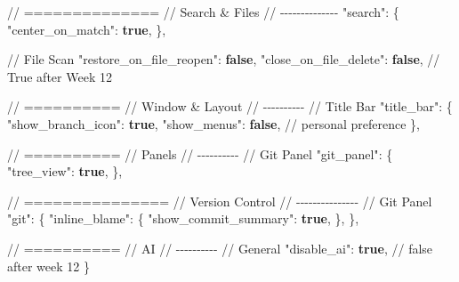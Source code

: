 \documentclass[
  letterpaper,
  DIV=11,
  numbers=noendperiod]{scrreprt}
\newenvironment{Shaded}{\begin{snugshade}}{\end{snugshade}}
\newcommand{\DataTypeTok}[1]{\textcolor[rgb]{0.68,0.00,0.00}{#1}}
\newcommand{\ErrorTok}[1]{\textcolor[rgb]{0.68,0.00,0.00}{#1}}
\newcommand{\FunctionTok}[1]{\textcolor[rgb]{0.28,0.35,0.67}{#1}}
\newcommand{\KeywordTok}[1]{\textcolor[rgb]{0.00,0.23,0.31}{\textbf{#1}}}
\begin{document}
\begin{codelisting}
\begin{Shaded}
\begin{Highlighting}[]
  \ErrorTok{//} \ErrorTok{==============}
  \ErrorTok{//} \ErrorTok{Search} \ErrorTok{\&} \ErrorTok{Files}
  \ErrorTok{//} \ErrorTok{{-}{-}{-}{-}{-}{-}{-}{-}{-}{-}{-}{-}{-}{-}}
  \DataTypeTok{"search"}\FunctionTok{:} \FunctionTok{\{}
    \DataTypeTok{"center\_on\_match"}\FunctionTok{:} \KeywordTok{true}\FunctionTok{,}
  \FunctionTok{\},}

  \ErrorTok{//} \ErrorTok{File} \ErrorTok{Scan}
  \DataTypeTok{"restore\_on\_file\_reopen"}\FunctionTok{:} \KeywordTok{false}\FunctionTok{,}
  \DataTypeTok{"close\_on\_file\_delete"}\FunctionTok{:} \KeywordTok{false}\FunctionTok{,} \ErrorTok{//} \ErrorTok{True} \ErrorTok{after} \ErrorTok{Week} \ErrorTok{12}

  \ErrorTok{//} \ErrorTok{==========}
  \ErrorTok{//} \ErrorTok{Window} \ErrorTok{\&} \ErrorTok{Layout}
  \ErrorTok{//} \ErrorTok{{-}{-}{-}{-}{-}{-}{-}{-}{-}{-}}
  \ErrorTok{//} \ErrorTok{Title} \ErrorTok{Bar}
  \DataTypeTok{"title\_bar"}\FunctionTok{:} \FunctionTok{\{}
    \DataTypeTok{"show\_branch\_icon"}\FunctionTok{:} \KeywordTok{true}\FunctionTok{,}
    \DataTypeTok{"show\_menus"}\FunctionTok{:} \KeywordTok{false}\FunctionTok{,} \ErrorTok{//} \ErrorTok{personal} \ErrorTok{preference}
  \FunctionTok{\},}

  \ErrorTok{//} \ErrorTok{==========}
  \ErrorTok{//} \ErrorTok{Panels}
  \ErrorTok{//} \ErrorTok{{-}{-}{-}{-}{-}{-}{-}{-}{-}{-}}
  \ErrorTok{//} \ErrorTok{Git} \ErrorTok{Panel}
  \DataTypeTok{"git\_panel"}\FunctionTok{:} \FunctionTok{\{}
    \DataTypeTok{"tree\_view"}\FunctionTok{:} \KeywordTok{true}\FunctionTok{,}
  \FunctionTok{\},}

  \ErrorTok{//} \ErrorTok{===============}
  \ErrorTok{//} \ErrorTok{Version} \ErrorTok{Control}
  \ErrorTok{//} \ErrorTok{{-}{-}{-}{-}{-}{-}{-}{-}{-}{-}{-}{-}{-}{-}{-}}
  \ErrorTok{//} \ErrorTok{Git} \ErrorTok{Panel}
  \DataTypeTok{"git"}\FunctionTok{:} \FunctionTok{\{}
    \DataTypeTok{"inline\_blame"}\FunctionTok{:} \FunctionTok{\{}
      \DataTypeTok{"show\_commit\_summary"}\FunctionTok{:} \KeywordTok{true}\FunctionTok{,}
    \FunctionTok{\},}
  \FunctionTok{\},}

  \ErrorTok{//} \ErrorTok{==========}
  \ErrorTok{//} \ErrorTok{AI}
  \ErrorTok{//} \ErrorTok{{-}{-}{-}{-}{-}{-}{-}{-}{-}{-}}
  \ErrorTok{//} \ErrorTok{General}
  \DataTypeTok{"disable\_ai"}\FunctionTok{:} \KeywordTok{true}\FunctionTok{,} \ErrorTok{//} \ErrorTok{false} \ErrorTok{after} \ErrorTok{week} \ErrorTok{12}
\FunctionTok{\}}
\end{Highlighting}
\end{Shaded}

\end{codelisting}
\end{document}
